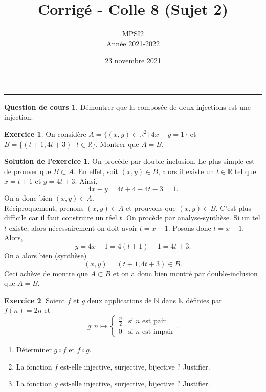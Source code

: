 \documentclass[a4paper, 11pt,openany]{article}%
\title{Corrigé - Colle 8 (Sujet 2)}
\author{MPSI2\\
Année 2021-2022}
\date{23 novembre 2021}
\theoremstyle{plain}
\theoremstyle{definition}
\newtheorem{cours}{Question de cours}
\newtheorem{exo}{Exercice}
\newtheorem{sol}{Solution de l'exercice}
\theoremstyle{remark}
\newcommand{\R}{\mathbb{R}}
\newcommand{\N}{\mathbb{N}}
\begin{document}
   \maketitle
      \rule{\linewidth}{0.5mm}


\begin{cours}
Démontrer que la composée de deux injections est une injection.
\end{cours}

\begin{exo}
On considère $A = \{ (x,y) \in \R^2 \, | \, 4x - y = 1\}$ et $B = \{ (t+1,4t+3) \, | \, t \in \R \}$. Montrer que $A =B$.
\end{exo}

\begin{sol}
On procède par double inclusion. Le plus simple est de prouver que $B \subset A$. En effet, soit $(x,y) \in B$, alors il existe un $t\in \R$ tel que $x = t+1$ et $y=4t+3$. Ainsi,
\[ 4x - y = 4t + 4 -4t - 3 = 1.\]
On a donc bien $(x,y) \in A$.\\
Réciproquement, prenons $(x,y) \in A$ et prouvons que $(x,y) \in B$. C'est plus difficile car il faut construire un réel $t$. On procède par analyse-synthèse. Si un tel $t$ existe, alors nécessairement on doit avoir $t = x-1$. Posons donc $t = x-1$. Alors,
\[ y = 4x-1 = 4(t+1)-1 = 4t +3.\]
On a alors bien (synthèse)
\[ (x,y) = (t+1,4t+3) \in B.\]
Ceci achève de montre que $A \subset B$ et on a donc bien montré par double-inclusion que $A = B$.
\end{sol}


\begin{exo}
Soient $f$ et $g$ deux applications de $\N$ dans $\N$ définies par $f(n) = 2n$ et 
\[ g  : n \mapsto   \left\{
    \begin{array}{ll}
        \frac{n}{2} & \mbox{si } n \mbox{ est pair} \\
        0 & \mbox{si } n \mbox{ est impair}
    \end{array}
\right..\]
\begin{enumerate}
\item Déterminer $g \circ f$ et $f \circ g$.
\item La fonction $f$ est-elle injective, surjective, bijective ? Justifier.
\item La fonction $g$ est-elle injective, surjective, bijective ? Justifier.
\end{enumerate}
\end{exo}
\end{document}
